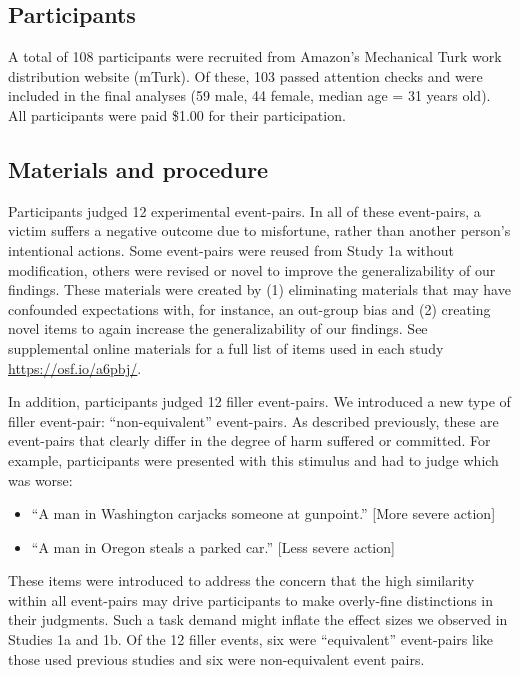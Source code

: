 \documentclass[10pt, letterpaper]{article}
\begin{document}
\subsection{Participants}\label{participants-2}

A total of 108 participants were recruited from Amazon's Mechanical Turk
work distribution website (mTurk). Of these, 103 passed attention checks
and were included in the final analyses (59 male, 44 female, median age
= 31 years old). All participants were paid \$1.00 for their
participation.

\subsection{Materials and procedure}\label{materials-and-procedure-2}

Participants judged 12 experimental event-pairs. In all of these
event-pairs, a victim suffers a negative outcome due to misfortune,
rather than another person's intentional actions. Some event-pairs were
reused from Study 1a without modification, others were revised or novel
to improve the generalizability of our findings. These materials were
created by (1) eliminating materials that may have confounded
expectations with, for instance, an out-group bias and (2) creating
novel items to again increase the generalizability of our findings. See
supplemental online materials for a full list of items used in each
study \url{https://osf.io/a6pbj/}.

In addition, participants judged 12 filler event-pairs. We introduced a
new type of filler event-pair: ``non-equivalent'' event-pairs. As
described previously, these are event-pairs that clearly differ in the
degree of harm suffered or committed. For example, participants were
presented with this stimulus and had to judge which was worse:

\begin{itemize}
\item
  ``A man in Washington carjacks someone at gunpoint.'' {[}More severe
  action{]}
\item
  ``A man in Oregon steals a parked car.'' {[}Less severe action{]}
\end{itemize}

These items were introduced to address the concern that the high
similarity within all event-pairs may drive participants to make
overly-fine distinctions in their judgments. Such a task demand might
inflate the effect sizes we observed in Studies 1a and 1b. Of the 12
filler events, six were ``equivalent'' event-pairs like those used
previous studies and six were non-equivalent event pairs.
\end{document}
